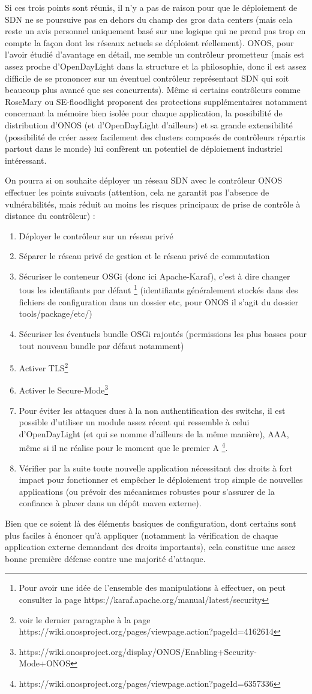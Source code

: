 Si ces trois points sont réunis, il n'y a pas de raison pour que le déploiement de SDN ne se poursuive pas en dehors du champ des gros data centers (mais cela reste un avis personnel uniquement basé sur une logique qui ne prend pas trop en compte la façon dont les réseaux actuels se déploient réellement). ONOS, pour l'avoir étudié d'avantage en détail, me semble un contrôleur prometteur (mais est assez proche d'OpenDayLight dans la structure et la philosophie, donc il est assez difficile de se prononcer sur un éventuel contrôleur représentant SDN qui soit beaucoup plus avancé que ses concurrents). Même si certains contrôleurs comme RoseMary ou SE-floodlight proposent des protections supplémentaires notamment concernant la mémoire bien isolée pour chaque application, la possibilité de distribution d'ONOS (et d'OpenDayLight d'ailleurs) et sa grande extensibilité (possibilité de créer assez facilement des clusters composés de contrôleurs répartis partout dans le monde) lui confèrent un potentiel de déploiement industriel intéressant. 

On pourra si on souhaite déployer un réseau SDN avec le contrôleur ONOS effectuer les points suivants (attention, cela ne garantit pas l'absence de vulnérabilités, mais réduit au moins les risques principaux de prise de contrôle à distance du contrôleur) :
\begin{enumerate}
\item Déployer le contrôleur sur un réseau privé
\item Séparer le réseau privé de gestion et le réseau privé de commutation
\item Sécuriser le conteneur OSGi (donc ici Apache-Karaf), c'est à dire changer tous les identifiants par défaut \footnote{Pour avoir une idée de l'ensemble des manipulations à effectuer, on peut consulter la page https://karaf.apache.org/manual/latest/security} (identifiants généralement stockés dans des fichiers de configuration dans un dossier etc, pour ONOS il s'agit du dossier tools/package/etc/) 
\item Sécuriser les éventuels bundle OSGi rajoutés (permissions les plus basses pour tout nouveau bundle par défaut notamment)
\item Activer TLS\footnote{voir le dernier paragraphe à la page https://wiki.onosproject.org/pages/viewpage.action?pageId=4162614}
\item Activer le Secure-Mode\footnote{https://wiki.onosproject.org/display/ONOS/Enabling+Security-Mode+ONOS}
\item Pour éviter les attaques dues à la non authentification des switchs, il est possible d'utiliser un module assez récent qui ressemble à celui d'OpenDayLight (et qui se nomme d'ailleurs de la même manière), AAA, même si il ne réalise pour le moment que le premier A \footnote{https://wiki.onosproject.org/pages/viewpage.action?pageId=6357336}.
\item Vérifier par la suite toute nouvelle application nécessitant des droits à fort impact pour fonctionner et empêcher le déploiement trop simple de nouvelles applications (ou prévoir des mécanismes robustes pour s'assurer de la confiance à placer dans un dépôt maven externe).
\end{enumerate}

Bien que ce soient là des éléments basiques de configuration, dont certains sont plus faciles à énoncer qu'à appliquer (notamment la vérification de chaque application externe demandant des droits importants), cela constitue une assez bonne première défense contre une majorité d'attaque.
